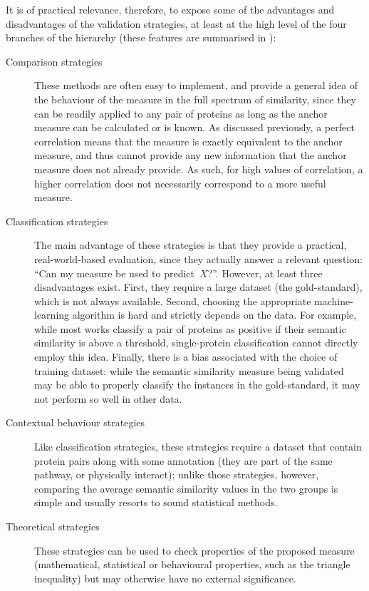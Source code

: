 It is of practical relevance, therefore, to expose some of the advantages and disadvantages of the validation strategies, at least at the high level of the four branches of the hierarchy (these features are summarised in ):
\begin{description}
    \item[Comparison strategies] These methods are often easy to implement, and provide a general idea of the behaviour of the measure in the full spectrum of similarity, since they can be readily applied to any pair of proteins as long as the anchor measure can be calculated or is known. As discussed previously, a perfect correlation means that the measure is exactly equivalent to the anchor measure, and thus cannot provide any new information that the anchor measure does not already provide. As such, for high values of correlation, a higher correlation does not necessarily correspond to a more useful measure.
    
    \item[Classification strategies] The main advantage of these strategies is that they provide a practical, real-world-based evaluation, since they actually answer a relevant question: ``Can my measure be used to predict~$X$?''. However, at least three disadvantages exist. First, they require a large dataset (the gold-standard), which is not always available. Second, choosing the appropriate machine-learning algorithm is hard and strictly depends on the data. For example, while most works classify a pair of proteins as positive if their semantic similarity is above a threshold, single-protein classification cannot directly employ this idea. Finally, there is a bias associated with the choice of training dataset: while the semantic similarity measure being validated may be able to properly classify the instances in the gold-standard, it may not perform so well in other data.
    
    \item[Contextual behaviour strategies] Like classification strategies, these strategies require a dataset that contain protein pairs along with some annotation (\eg they are part of the same pathway, or physically interact); unlike those strategies, however, comparing the average semantic similarity values in the two groups is simple and usually resorts to sound statistical methods.
    
    \item[Theoretical strategies] These strategies can be used to check properties of the proposed measure (\eg mathematical, statistical or behavioural properties, such as the triangle inequality) but may otherwise have no external significance.
\end{description}

